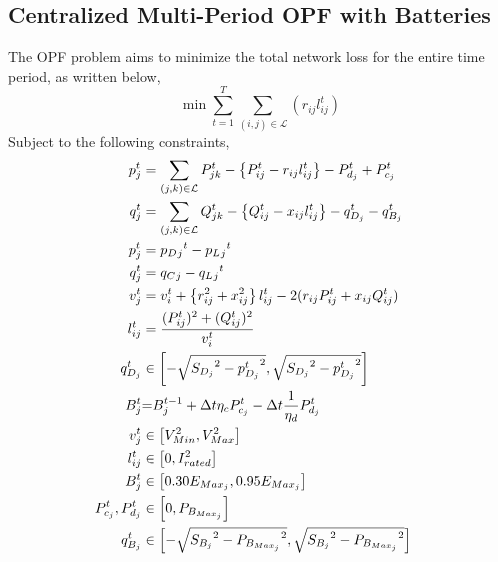 \documentclass{article}
\begin{document}
\subsection{Centralized Multi-Period OPF with Batteries}
The OPF problem aims to minimize the total network loss for the entire time period, as written below,
\begin{equation}
    \min {\sum_{t = 1}^{T} \sum_{(i, j) \in \mathcal{L}} (r_{ij}l_{ij}^t)}
\end{equation}
Subject to the following constraints,
\begin{align}
    {p_j^t} & = {\sum_{(j, k) \in \mathcal{L}} P_{jk}^t - \left\{P_{ij}^t - r_{ij}l_{ij}^t\right\} - P_{d_j}^t + P_{c_j}^t} && \label{eq:Pij} \\ 
    {q_j^t} & = {\sum_{(j, k) \in \mathcal{L}} Q_{jk}^t - \left\{Q_{ij}^t - x_{ij}l_{ij}^t\right\} - q_{D_j}^t - q_{B_j}^t} && \label{eq:Qij} \\ 
    {p_j^t} &= {p_D{_j}^t - p_L{_j}^t} \label{eq:pj}\\
    {q_j^t} &= {q_C{_j} -q_L{_j}^t} \label{eq:qj}\\
    {v_j^t} & = {v_{i}^t +  \left\{r_{ij}^2 + x_{ij}^2\right\}l_{ij}^t - 2(r_{ij}P_{ij}^t + x_{ij}Q_{ij}^t)} \label{eq:vj} && \\
    {l_{ij}^t} & = {\frac{(P_{ij}^{t})^2 + (Q_{ij}^{t})^2}{v_i^t}} \label{eq:lij} && \\
    { q^{t}_{D_{j}} } 
    &\in
    { \left[-\sqrt{ {S_{D_{j}}}^2 - {p^{t}_{D_{j}}}^2}, \sqrt{ {S_{D_{j}}}^2 - {p^{t}_{D_{j}}}^2}\right] } \label{eq:qDj} && \\
    {\color{darkgreen}{ B_{j}^{t} }} &\color{darkgreen}{=} { \color{darkgreen}{ B_{j}^{t-1} + \Delta t  \eta_c P_{c_j}^t - \Delta t\frac{1}{\eta_d} P_{d_j}^t } } && \\
    { v^{t}_{j} } &\in { \left[ V^{2}_{Min}, V^{2}_{Max} \right]} \label{eq:lim_vj} && \\
    { l^{t}_{ij} } &\in { \left[ 0, I^{2}_{rated}
    \right] } \label{eq:lim_lij} && \\
    { B^{t}_{j} } &\in { \left[ 0.30E_{Max_{j}}, 0.95E_{Max_{j}} \right] } \label{eq:lim_Bj} && \\
    { P^{t}_{c_{j}}, P^{t}_{d_{j}} }
    &\in
    { \left[ 0, P_{B_{Max_{j}}} \right]} \label{eq:lim_PcPdj} && \\
    { q^{t}_{B_{j}} } 
    &\in 
    { \left[-\sqrt{ {S_{B_{j}}}^2 - {P_{B_{Max_{j}}}}^2}, \sqrt{ {S_{B_{j}}}^2 - {P_{B_{Max_{j}}}}^2}\right] } \label{eq:qBj} &&
\end{align}
\end{document}
